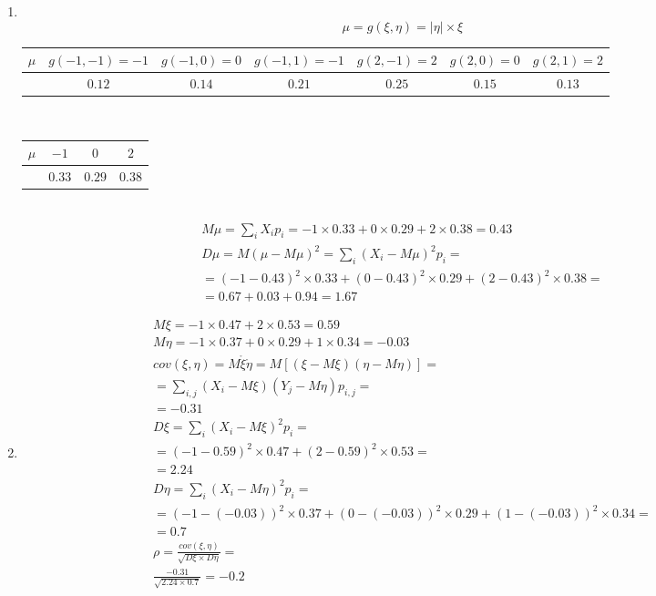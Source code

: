 \documentclass[12pt]{article}
\begin{document}
\begin{enumerate}
	\item \mbox{}\\
	      \[\mu = g(\xi, \eta) = |\eta| \times \xi\]
	      \begin{tabular}{|c|c|c|c|c|c|c|}
		      \hline
		      $\mu$ & $g(-1, -1) = -1$ & $g(-1, 0) = 0$ & $g(-1, 1) = -1$ & $g(2, -1) = 2$ & $g(2, 0) = 0$ & $g(2, 1) = 2$ \\
		      \hline
		            & $0.12$           & $0.14$         & $0.21$          & $0.25$         & $0.15$        & $0.13$        \\
		      \hline
	      \end{tabular} \\
	      \begin{tabular}{|c|c|c|c|}
		      \hline
		      $\mu$ & $-1$   & $0$    & $2$    \\
		      \hline
		            & $0.33$ & $0.29$ & $0.38$ \\
		      \hline
	      \end{tabular} \\
	      \begin{gather*}
		      M\mu = \sum_iX_ip_i = -1 \times 0.33 + 0 \times 0.29 + 2 \times 0.38 = 0.43 \\
		      D\mu = M(\mu - M\mu)^2 = \sum_i\left(X_i-M\mu\right)^2p_i = \\
		      = (-1 - 0.43)^2 \times 0.33 + (0 - 0.43)^2 \times 0.29 + (2 - 0.43)^2 \times 0.38 = \\
		      = 0.67 + 0.03 + 0.94 = 1.67
	      \end{gather*}

	\item \mbox{}
	      \begin{gather*}
		      M\xi = -1 \times 0.47 + 2 \times 0.53 = 0.59 \\
		      M\eta = -1 \times 0.37 + 0 \times 0.29 + 1 \times 0.34 = -0.03 \\
		      cov(\xi, \eta) = M\mathring{\xi}\mathring{\eta} = M\left[\left(\xi - M\xi\right)\left(\eta - M\eta\right)\right] = \\
		      = \sum_{i, j}\left(X_i - M\xi\right)\left(Y_j - M\eta\right)p_{i,j} = \\
		      = -0.31 \\ %
		      D\xi = \sum_i\left(X_i-M\xi\right)^2p_i = \\
		      = (-1 - 0.59)^2 \times 0.47 + (2 - 0.59)^2 \times 0.53 = \\
		      = 2.24 \\
		      D\eta = \sum_i\left(X_i-M\eta\right)^2p_i = \\
		      = (-1 - (-0.03))^2 \times 0.37 + (0 - (-0.03))^2 \times 0.29 + (1 - (-0.03))^2 \times 0.34 = \\
		      = 0.7 \\
		      \rho = \frac{cov(\xi, \eta)}{\sqrt{D\xi \times D\eta}} = \\
		      \frac{-0.31}{\sqrt{2.24 \times 0.7}} = -0.2
	      \end{gather*}
\end{enumerate}
\end{document}
